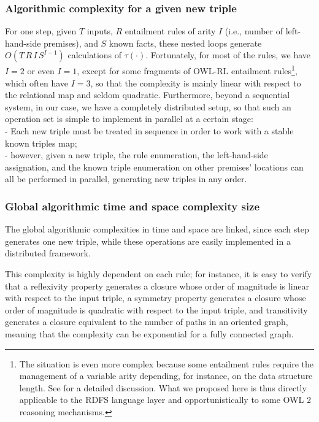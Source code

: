\documentclass[sn-mathphys]{sn-jnl}
\begin{document}
\subsubsection{Algorithmic complexity for a given new triple}

For one step, given $T$ inputs, $R$ entailment rules of arity $I$ (i.e., number of left-hand-side premises), and $S$ known facts, these nested loops generate $O(T\,R\,I\,S^{I-1})$ calculations of $\tau(\cdot)$. Fortunately, for most of the rules, we have $I=2$ or even $I=1$, except for some fragments of OWL-RL entailment rules\footnote{The situation is even more complex because some entailment rules require the management of a variable arity depending, for instance, on the data structure length. See \cite{cao_web_2014} for a detailed discussion. What we proposed here is thus directly applicable to the RDFS language layer and opportunistically to some OWL 2 reasoning mechanisms.}, which often have $I=3$, so that the complexity is mainly linear with respect to the relational map and seldom quadratic. Furthermore, beyond a sequential system, in our case, we have a completely distributed setup, so that such an operation set is simple to implement in parallel at a certain stage:
\\- Each new triple must be treated in sequence in order to work with a stable known triples map;
\\- however, given a new triple, the rule enumeration, the left-hand-side assignation, and the known triple enumeration on other premises' locations can all be performed in parallel, generating new triples in any order.

\subsubsection{Global algorithmic time and space complexity size}

The global algorithmic complexities in time and space are linked, since each step generates one new triple, while these operations are easily implemented in a distributed framework.

This complexity is highly dependent on each rule; for instance, it is easy to verify that a reflexivity property generates a closure whose order of magnitude is linear with respect to the input triple, a symmetry property generates a closure whose order of magnitude is quadratic with respect to the input triple, and transitivity generates a closure equivalent to the number of paths in an oriented graph, meaning that the complexity can be exponential for a fully connected graph.
\end{document}
